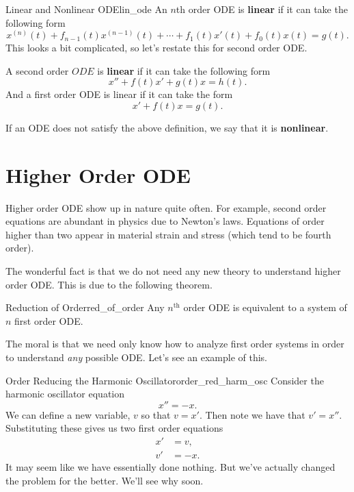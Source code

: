         \begin{df}{Linear and Nonlinear ODE}{lin_ode}
        An $n$th order ODE is \textbf{linear} if it can take the following form
        \[
        x^{(n)}(t)+f_{n-1}(t)x^{(n-1)}(t)+\cdots + f_1(t)x'(t) +f_0(t)x(t)=g(t).
        \]
        This looks a bit complicated, so let's restate this for second order ODE.
        
        A second order $ODE$ is \textbf{linear} if it can take the following form
        \[
        x''+f(t)x'+g(t)x=h(t).
        \]
        And a first order ODE is linear if it can take the form
        \[
        x'+f(t)x=g(t).
        \]
        
        If an ODE does not satisfy the above definition, we say that it is \textbf{nonlinear}.
        \end{df}
        
        
        \section{Higher Order ODE}
        Higher order ODE show up in nature quite often.  For example, second order equations are abundant in physics due to Newton's laws.  Equations of order higher than two appear in material strain and stress (which tend to be fourth order).  
        
        The wonderful fact is that we do not need any new theory to understand higher order ODE.  This is due to the following theorem.
        
        \begin{thm}{Reduction of Order}{red_of_order}
        Any $n ^\textrm{th}$ order ODE is equivalent to a system of $n$ first order ODE.  
        \end{thm}
        
        The moral is that we need only know how to analyze first order systems in order to understand \emph{any} possible ODE.  Let's see an example of this.
        
        \begin{ex}{Order Reducing the Harmonic Oscillator}{order_red_harm_osc}
        Consider the harmonic oscillator equation
        \[
        x''=-x.
        \]
        We can define a new variable, $v$ so that $v=x'$.  Then note we have that $v'=x''$.  Substituting these gives us two first order equations
        \begin{align*}
            x'&=v,\\
            v'&=-x.
        \end{align*}
        It may seem like we have essentially done nothing.  But we've actually changed the problem for the better.  We'll see why soon.
        \end{ex}
        
